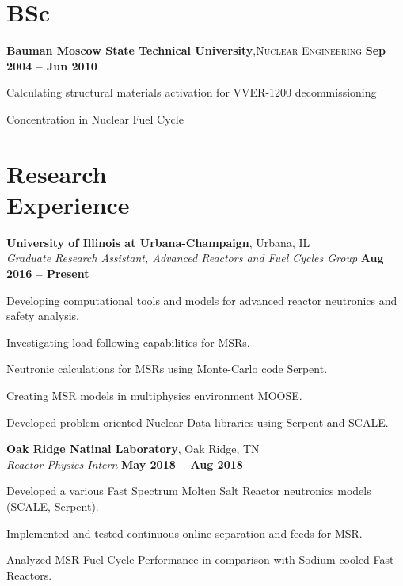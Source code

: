 \documentclass[margin,line]{resume}
\begin{document}
\begin{resume}
    \section{\mysidestyle BSc}
    \textbf{Bauman Moscow State Technical University},\textsc{Nuclear Engineering}\hfill \textbf{ Sep 2004 -- Jun 2010}\vspace{-3mm}\\\vspace{-1mm}%
    \begin{list2}
	\item Calculating structural materials activation for VVER-1200 decommissioning
	\item Concentration in Nuclear Fuel Cycle
    \end{list2}\vspace{-1.5mm}
    \section{\mysidestyle Research\\Experience}               
    \textbf{University of Illinois at Urbana-Champaign}, Urbana, IL\\
		\textsl{Graduate Research Assistant, Advanced Reactors and Fuel Cycles Group} \hfill \textbf{Aug 2016 -- Present}\\
                \vspace{-4mm}\begin{list2}
                \item Developing computational tools and models for advanced reactor neutronics and safety analysis.
                \item Investigating load-following capabilities for MSRs.
                \item Neutronic calculations for MSRs using Monte-Carlo code Serpent.
				\item Creating MSR models in multiphysics environment MOOSE.
				\item Developed problem-oriented Nuclear Data libraries using Serpent and SCALE.
                \end{list2}

    \textbf{Oak Ridge Natinal Laboratory}, Oak Ridge, TN\\
		\textsl{Reactor Physics Intern} \hfill \textbf{May 2018 -- Aug 2018}\\
                \vspace{-4mm}\begin{list2}
                \item Developed a various Fast Spectrum Molten Salt Reactor neutronics models (SCALE, Serpent).
				\item Implemented and tested continuous online separation and feeds for MSR.
				\item Analyzed MSR Fuel Cycle Performance in comparison with Sodium-cooled Fast Reactors.
                \end{list2}


\end{resume}
\end{document}
